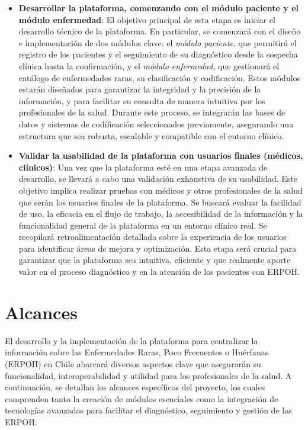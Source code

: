 \documentclass{article}
\begin{document}
\begin{itemize}[leftmargin=1.2em]
\item \textbf{Desarrollar la plataforma, comenzando con el módulo paciente y el módulo enfermedad}:
El objetivo principal de esta etapa es iniciar el desarrollo técnico de la plataforma. En particular, se comenzará con el diseño e implementación de dos módulos clave: el \textit{módulo paciente}, que permitirá el registro de los pacientes y el seguimiento de su diagnóstico desde la sospecha clínica hasta la confirmación, y el \textit{módulo enfermedad}, que gestionará el catálogo de enfermedades raras, su clasificación y codificación. Estos módulos estarán diseñados para garantizar la integridad y la precisión de la información, y para facilitar su consulta de manera intuitiva por los profesionales de la salud. Durante este proceso, se integrarán las bases de datos y sistemas de codificación seleccionados previamente, asegurando una estructura que sea robusta, escalable y compatible con el entorno clínico.

\item \textbf{Validar la usabilidad de la plataforma con usuarios finales (médicos, clínicos)}:
Una vez que la plataforma esté en una etapa avanzada de desarrollo, se llevará a cabo una validación exhaustiva de su usabilidad. Este objetivo implica realizar pruebas con médicos y otros profesionales de la salud que serán los usuarios finales de la plataforma. Se buscará evaluar la facilidad de uso, la eficacia en el flujo de trabajo, la accesibilidad de la información y la funcionalidad general de la plataforma en un entorno clínico real. Se recopilará retroalimentación detallada sobre la experiencia de los usuarios para identificar áreas de mejora y optimización. Esta etapa será crucial para garantizar que la plataforma sea intuitiva, eficiente y que realmente aporte valor en el proceso diagnóstico y en la atención de los pacientes con ERPOH.

\end{itemize}
\section{Alcances}

El desarrollo y la implementación de la plataforma para centralizar la información sobre las Enfermedades Raras, Poco Frecuentes o Huérfanas (ERPOH) en Chile abarcará diversos aspectos clave que asegurarán su funcionalidad, interoperabilidad y utilidad para los profesionales de la salud. A continuación, se detallan los alcances específicos del proyecto, los cuales comprenden tanto la creación de módulos esenciales como la integración de tecnologías avanzadas para facilitar el diagnóstico, seguimiento y gestión de las ERPOH:
\end{document}
